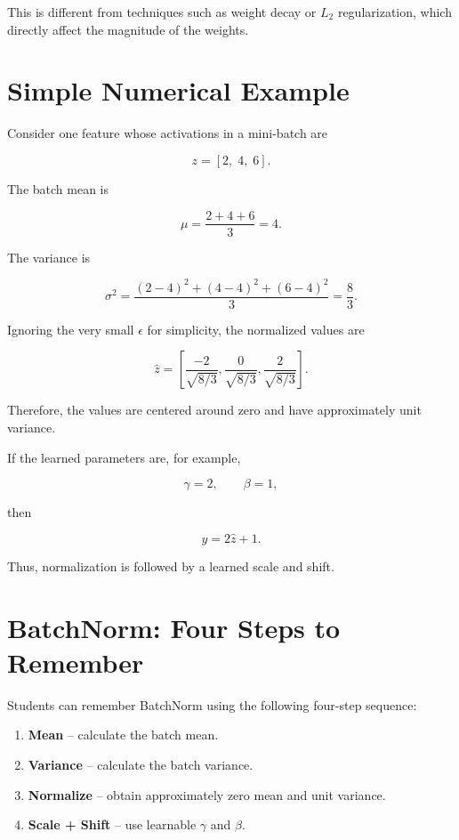 \documentclass[11pt,a4paper]{article}
\begin{document}
	This is different from techniques such as weight decay or $L_2$
	regularization, which directly affect the magnitude of the weights.
	
	\section{Simple Numerical Example}
	
	Consider one feature whose activations in a mini-batch are
	
	\[
	z=[2,\;4,\;6].
	\]
	
	The batch mean is
	
	\begin{equation}
		\mu=\frac{2+4+6}{3}=4.
	\end{equation}
	
	The variance is
	
	\begin{equation}
		\sigma^2
		=
		\frac{(2-4)^2+(4-4)^2+(6-4)^2}{3}
		=
		\frac{8}{3}.
	\end{equation}
	
	Ignoring the very small $\epsilon$ for simplicity, the normalized values
	are
	
	\begin{equation}
		\hat{z}
		=
		\left[
		\frac{-2}{\sqrt{8/3}},
		\frac{0}{\sqrt{8/3}},
		\frac{2}{\sqrt{8/3}}
		\right].
	\end{equation}
	
	Therefore, the values are centered around zero and have approximately
	unit variance.
	
	If the learned parameters are, for example,
	
	\[
	\gamma=2,
	\qquad
	\beta=1,
	\]
	
	then
	
	\begin{equation}
		y=2\hat{z}+1.
	\end{equation}
	
	Thus, normalization is followed by a learned scale and shift.
	
	\section{BatchNorm: Four Steps to Remember}
	
	Students can remember BatchNorm using the following four-step sequence:
	
	\begin{enumerate}
		\item \textbf{Mean} -- calculate the batch mean.
		\item \textbf{Variance} -- calculate the batch variance.
		\item \textbf{Normalize} -- obtain approximately zero mean and unit variance.
		\item \textbf{Scale + Shift} -- use learnable $\gamma$ and $\beta$.
	\end{enumerate}
	
\end{document}
